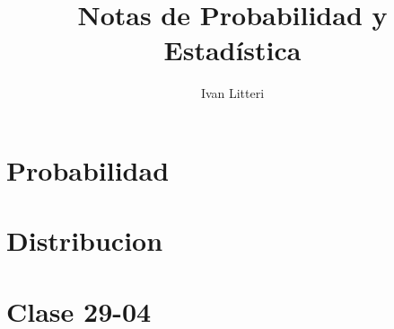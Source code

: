 \documentclass[hidelinks]{article}
\title{Notas de Probabilidad y Estadística}
\author{Ivan Litteri}
\date{}
\begin{document}
\maketitle
\tableofcontents
\clearpage

\section{Probabilidad}

\clearpage

\section{Distribucion}

\clearpage

% 

\section{Clase 29-04}

\clearpage

\printindex
\end{document}
